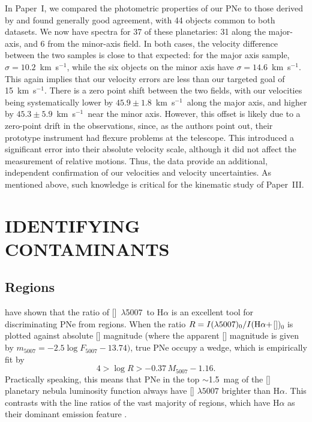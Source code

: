 \documentclass[12pt,preprint]{emulateapj}
\newcommand{\eg}{{e.g.,}}
\newcommand{\kms}{km~s$^{-1}$}
\newcommand{\Oline}{[\ion{O}{3}]~$\lambda$5007}
\begin{document}
In Paper~I, we compared the photometric properties of our PNe to those derived by \citet{M94PNS} and found generally good agreement, with 44 objects common to both datasets.   We now have spectra for 37 of these planetaries: 31 along the major-axis, and 6 from the minor-axis field.  In both cases, the velocity difference between the two samples is close to that expected: for the major axis sample, $\sigma = 10.2$~\kms, while the six objects on the minor axis have $\sigma = 14.6$~\kms.   This again implies that our velocity errors are less than our targeted goal of 15~\kms.  There is a zero point shift between the two fields, with our velocities being systematically lower by $45.9 \pm 1.8$~\kms\ along the major axis, and higher by $45.3 \pm 5.9$~\kms\ near the minor axis.  However, this offset is likely due to a zero-point drift in the \citet{M94PNS} observations, since, as the authors point out, their prototype instrument had flexure problems at the telescope.  This introduced a significant error into their absolute velocity scale, although it did not affect the measurement of relative motions.   Thus, the data provide an additional, independent confirmation of our velocities and velocity uncertainties.  As mentioned above, such knowledge is critical for the kinematic study of Paper~III.

\section{IDENTIFYING CONTAMINANTS}
\subsection{ Regions}
\citet{p12} have shown that the ratio of \Oline\ to H$\alpha$ is an excellent tool for discriminating PNe from  regions.  When the ratio $R = I(\lambda 5007)_0/I({\rm H}\alpha+$[])$_0$ is plotted against absolute [] magnitude (where the apparent [] magnitude is given by $m_{5007} = -2.5 \log F_{5007} - 13.74)$, true PNe occupy a wedge, which is empirically fit by
\begin{equation}
4 > \log R > -0.37 \, M_{5007} - 1.16.\label{eqsquiggle1}
\end{equation}
Practically speaking, this means that PNe in the top $\sim$1.5~mag of the [] planetary nebula luminosity function always have [] $\lambda 5007$ brighter than H$\alpha$.  This contrasts with the line ratios of the vast majority of  regions, which have H$\alpha$ as their dominant emission feature \citep[\eg][]{shaver, kniazev, pena}.
\end{document}
